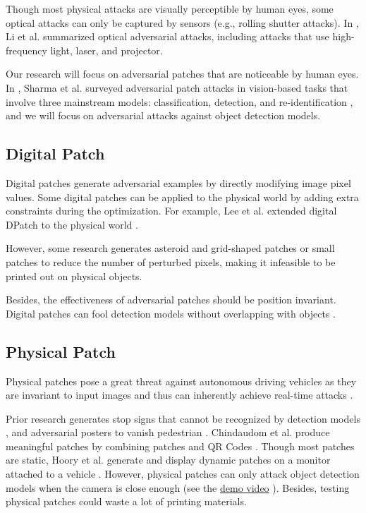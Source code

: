 Though most physical attacks are visually perceptible by human eyes, some optical attacks can only be captured by sensors (e.g., rolling shutter attacks). In \cite{li2022survey}, Li et al. summarized optical adversarial attacks, including attacks that use high-frequency light, laser, and projector.

Our research will focus on adversarial patches that are noticeable by human eyes. In \cite{sharma2022adversarial}, Sharma et al. surveyed adversarial patch attacks in vision-based tasks that involve three mainstream models: classification, detection, and re-identification \cite{wei2022physical}, and we will focus on adversarial attacks against object detection models.

\subsection{Digital Patch}

Digital patches generate adversarial examples by directly modifying image pixel values. Some digital patches can be applied to the physical world by adding extra constraints during the optimization. For example, Lee et al. extended digital DPatch \cite{liu2018dpatch} to the physical world \cite{lee2019physical}.

However, some research generates asteroid and grid-shaped patches \cite{wu2020dpattack} or small patches \cite{huang2021rpattack} to reduce the number of perturbed pixels, making it infeasible to be printed out on physical objects. 

Besides, the effectiveness of adversarial patches should be position invariant. Digital patches can fool detection models without overlapping with objects \cite{saha2019adversarial}.

\subsection{Physical Patch}

Physical patches pose a great threat against autonomous driving vehicles as they are invariant to input images and thus can inherently achieve real-time attacks \cite{threet2021physical}. 

Prior research generates stop signs that cannot be recognized by detection models \cite{song2018physical} \cite{chen2019shapeshifter}, and adversarial posters to vanish pedestrian \cite{thys2019fooling} \cite{wang2021towards}. Chindaudom et al. produce meaningful patches by combining patches and QR Codes \cite{chindaudom2020adversarialqr} \cite{chindaudom2022surreptitious}. Though most patches are static, Hoory et al. generate and display dynamic patches on a monitor attached to a vehicle \cite{hoory2020dynamic}. However, physical patches can only attack object detection models when the camera is close enough (see the \href{https://www.youtube.com/watch?v=gps37SqC7dU}{demo video} \cite{wang2021daedalus} \cite{lu2021scale}). Besides, testing physical patches could waste a lot of printing materials.

